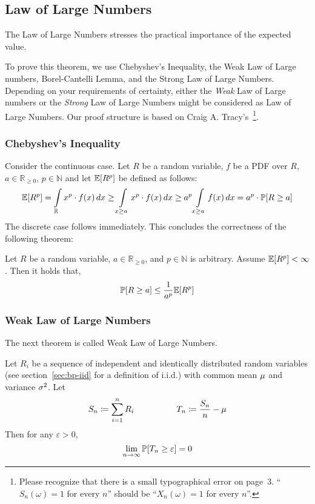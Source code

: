 \subsection{Law of Large Numbers}
\label{sec:bp-lln}
%
The Law of Large Numbers stresses the practical importance of the expected value.

To prove this theorem, we use Chebyshev's Inequality, the Weak Law of Large numbers,
Borel-Cantelli Lemma, and the Strong Law of Large Numbers.
Depending on your requirements of certainty, either the \emph{Weak} Law of Large numbers or
the \emph{Strong} Law of Large Numbers might be considered as Law of Large Numbers.
Our proof structure is based on Craig A. Tracy's~\cite{cnfgen}\footnote{
  Please recognize that there is a small typographical error on page~3.
  \enquote{$S_n(\omega) = 1$ for every $n$} should be \enquote{$X_n(\omega) = 1$ for every $n$}.
}.

\subsubsection{Chebyshev's Inequality}
\label{sec:bp-chebyshev}
%
Consider the continuous case.
Let $R$ be a random variable, $f$ be a PDF over $R$,
$a \in \mathbb R_{\geq 0}$, $p \in \mathbb N$ and let $\mathbb E[R^p]$ be defined as follows:
\begin{align*}
  \mathbb E[R^p]
          = \int\limits_{\mathbb R} x^p \cdot f(x) \, dx 
          \geq \int\limits_{x \geq a} x^p \cdot f(x) \, dx 
          \geq a^p \int\limits_{x \geq a} f(x) \, dx 
          = a^p \cdot \mathbb P[R \geq a]
\end{align*}
The discrete case follows immediately.
This concludes the correctness of the following theorem:
\begin{theorem}\label{thm:chebyshev}
  Let $R$ be a random variable, $a \in \mathbb R_{\geq 0}$, and $p \in \mathbb N$ is arbitrary.
  Assume $\mathbb E[R^p] < \infty$.
  Then it holds that,
  \[ \mathbb P[R \geq a] \leq \frac{1}{a^p} \mathbb E[R^p] \]
\end{theorem}

\subsubsection{Weak Law of Large Numbers}
\label{sec:bp-weak-law}
%
The next theorem is called Weak Law of Large Numbers.
\begin{theorem}\label{thm:weak-lln}
  Let $R_i$ be a sequence of independent and identically distributed random variables
  (see section~\ref{sec:bp-iid} for a definition of i.i.d.)
  with common mean $\mu$ and variance $\sigma^2$. Let
  \[
      S_n \coloneqq \sum_{i=1}^n R_i \hspace{50pt}
      T_n \coloneqq \frac{S_n}{n} - \mu
  \]
  Then for any $\varepsilon > 0$,
  \[ \lim_{n\to\infty} \mathbb P[T_n \geq \varepsilon] = 0 \]
\end{theorem}

